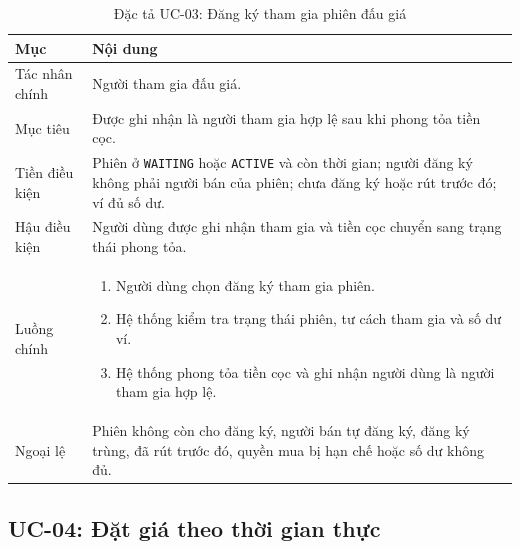 \documentclass[../DoAn.tex]{subfiles}
\begin{document}
\begin{table}[H]
    \centering
    \caption{Đặc tả UC-03: Đăng ký tham gia phiên đấu giá}
    \label{tab:uc-register-auction}
    \footnotesize
    \setlength{\tabcolsep}{4pt}
    \renewcommand{\arraystretch}{1.03}
    \begin{tabular}{|>{\raggedright\arraybackslash}p{}|>{\raggedright\arraybackslash}p{}|}
        \hline
        \textbf{Mục} & \textbf{Nội dung} \\
        \hline
        Tác nhân chính & Người tham gia đấu giá. \\
        \hline
        Mục tiêu & Được ghi nhận là người tham gia hợp lệ sau khi phong tỏa tiền cọc. \\
        \hline
        Tiền điều kiện & Phiên ở \texttt{WAITING} hoặc \texttt{ACTIVE} và còn thời gian; người đăng ký không phải người bán của phiên; chưa đăng ký hoặc rút trước đó; ví đủ số dư. \\
        \hline
        Hậu điều kiện & Người dùng được ghi nhận tham gia và tiền cọc chuyển sang trạng thái phong tỏa. \\
        \hline
        Luồng chính &
        \begin{enumerate}[label=\roman*., leftmargin=*, nosep]
            \item Người dùng chọn đăng ký tham gia phiên.
            \item Hệ thống kiểm tra trạng thái phiên, tư cách tham gia và số dư ví.
            \item Hệ thống phong tỏa tiền cọc và ghi nhận người dùng là người tham gia hợp lệ.
        \end{enumerate} \\
        \hline
        Ngoại lệ & Phiên không còn cho đăng ký, người bán tự đăng ký, đăng ký trùng, đã rút trước đó, quyền mua bị hạn chế hoặc số dư không đủ. \\
        \hline
    \end{tabular}
\end{table}
\FloatBarrier

\subsection{UC-04: Đặt giá theo thời gian thực}
\end{document}
